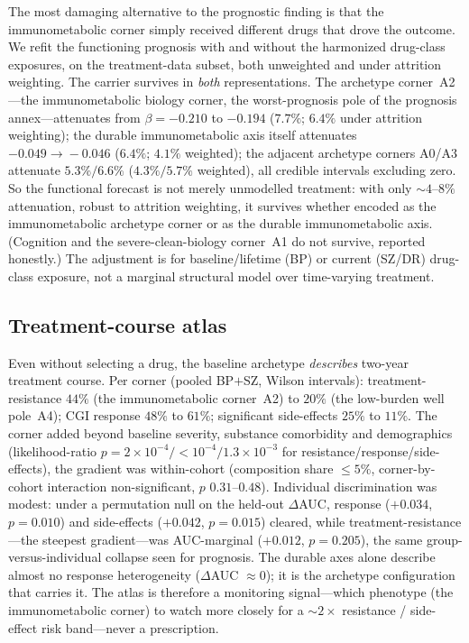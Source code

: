 The most damaging alternative to the prognostic finding is that the immunometabolic
corner simply received different drugs that drove the outcome. We refit the functioning
prognosis with and without the harmonized drug-class exposures, on the treatment-data
subset, both unweighted and under attrition weighting. The carrier survives in
\emph{both} representations. The archetype corner~A2---the immunometabolic biology corner,
the worst-prognosis pole of the prognosis annex---attenuates from $\beta=-0.210$ to
$-0.194$ ($7.7\%$; $6.4\%$ under attrition weighting); the durable immunometabolic axis
itself attenuates $-0.049\!\to\!-0.046$ ($6.4\%$; $4.1\%$ weighted); the adjacent
archetype corners A0/A3 attenuate $5.3\%/6.6\%$ ($4.3\%/5.7\%$ weighted), all credible
intervals excluding zero. So the functional forecast is not merely unmodelled treatment:
with only $\sim4$--$8\%$ attenuation, robust to attrition weighting, it survives whether
encoded as the immunometabolic archetype corner or as the durable immunometabolic axis.
(Cognition and the severe-clean-biology corner~A1 do not survive, reported honestly.) The
adjustment is for baseline/lifetime (BP) or current (SZ/DR) drug-class exposure, not a
marginal structural model over time-varying treatment.

\subsection{Treatment-course atlas}

Even without selecting a drug, the baseline archetype \emph{describes} two-year
treatment course. Per corner (pooled BP$+$SZ, Wilson intervals): treatment-resistance
$44\%$ (the immunometabolic corner~A2) to $20\%$ (the low-burden well pole~A4); CGI
response $48\%$ to $61\%$; significant side-effects $25\%$ to $11\%$. The corner added
beyond baseline severity, substance comorbidity and demographics (likelihood-ratio
$p=2\times10^{-4}/{<}10^{-4}/1.3\times10^{-3}$ for resistance/response/side-effects), the
gradient was within-cohort (composition share $\le5\%$, corner-by-cohort interaction
non-significant, $p$ $0.31$--$0.48$). Individual discrimination was modest: under a
permutation null on the held-out $\Delta$AUC, response ($+0.034$, $p=0.010$) and
side-effects ($+0.042$, $p=0.015$) cleared, while treatment-resistance---the steepest
gradient---was AUC-marginal ($+0.012$, $p=0.205$), the same group-versus-individual
collapse seen for prognosis. The durable axes alone describe almost no response
heterogeneity ($\Delta$AUC $\approx0$); it is the archetype configuration that carries it.
The atlas is therefore a monitoring signal---which phenotype (the immunometabolic corner)
to watch more closely for a $\sim2\times$ resistance / side-effect risk band---never a
prescription.
